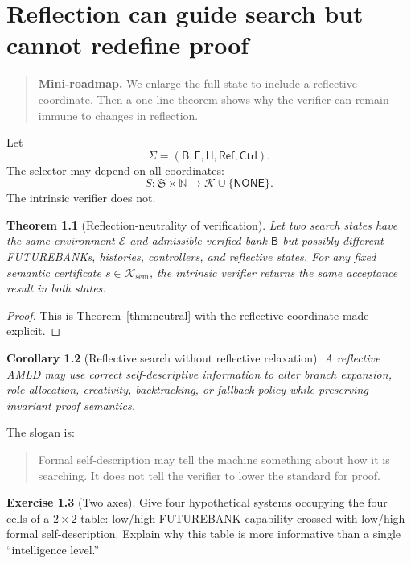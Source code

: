 \documentclass[11pt,openany]{book}
\newtheorem{theorem}{Theorem}[chapter]
\newtheorem{corollary}[theorem]{Corollary}
\theoremstyle{definition}
\newtheorem{exercise}[theorem]{Exercise}
\theoremstyle{remark}
\newenvironment{miniroadmap}{\begin{quote}\small\color{deepblue}\textbf{Mini-roadmap.} }{\end{quote}}
\newcommand{\Bank}{\mathsf{B}}
\newcommand{\Future}{\mathsf{F}}
\newcommand{\Hist}{\mathsf{H}}
\newcommand{\State}{\Sigma}
\newcommand{\StateSpace}{\mathfrak{S}}
\newcommand{\Cert}{\mathcal{K}}
\newcommand{\Env}{\mathcal{E}}
\newcommand{\Refl}{\mathsf{Ref}}
\newcommand{\N}{\mathbb{N}}
\begin{document}
\chapter{Reflection can guide search but cannot redefine proof}
\begin{miniroadmap}
We enlarge the full state to include a reflective coordinate. Then a one-line theorem shows why the verifier can remain immune to changes in reflection.
\end{miniroadmap}

Let
\[
\State=(\Bank,\Future,\Hist,\Refl,\mathsf{Ctrl}).
\]
The selector may depend on all coordinates:
\[
S:\StateSpace\times\N\longrightarrow\Cert\cup\{\textsf{NONE}\}.
\]
The intrinsic verifier does not.

\begin{theorem}[Reflection-neutrality of verification]\label{thm:reflectionneutral}
Let two search states have the same environment $\Env$ and admissible verified bank $\Bank$ but possibly different FUTUREBANKs, histories, controllers, and reflective states. For any fixed semantic certificate $s\in\Cert_{\mathrm{sem}}$, the intrinsic verifier returns the same acceptance result in both states.
\end{theorem}
\begin{proof}
This is Theorem~\ref{thm:neutral} with the reflective coordinate made explicit.
\end{proof}

\begin{corollary}[Reflective search without reflective relaxation]
A reflective AMLD may use correct self-descriptive information to alter branch expansion, role allocation, creativity, backtracking, or fallback policy while preserving invariant proof semantics.
\end{corollary}

The slogan is:
\begin{quote}
Formal self-description may tell the machine something about how it is searching. It does not tell the verifier to lower the standard for proof.
\end{quote}

\begin{exercise}[Two axes]\label{ex:axes}
Give four hypothetical systems occupying the four cells of a $2\times2$ table: low/high FUTUREBANK capability crossed with low/high formal self-description. Explain why this table is more informative than a single ``intelligence level.''
\end{exercise}
\end{document}

